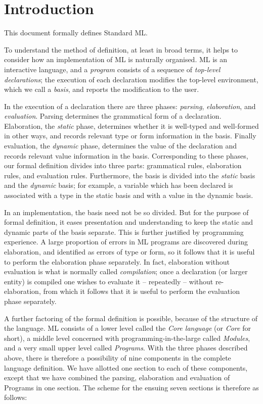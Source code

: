 \section{Introduction}

This document formally defines Standard ML.

To understand the method of definition, at least in broad terms, it helps to
consider how an implementation of ML is naturally
organised.  ML is an interactive
language, 
and a {\sl program}  consists of a sequence of {\sl top-level
declarations}; the execution
of each declaration modifies the top-level environment, which we call
a {\sl basis}, and reports the modification to the user.

In the execution of a declaration there are three phases:
{\sl parsing}, {\sl elaboration}, and {\sl evaluation}.  
Parsing
determines the grammatical form of a declaration.  Elaboration, the
{\sl static} phase, determines whether it is well-typed and
well-formed in other ways, and records relevant type or form information
in the basis. Finally evaluation, the {\sl dynamic} phase, determines the
value of the declaration and records relevant value information in the
basis.  Corresponding to these phases, our formal definition divides
into three parts:  grammatical rules, elaboration rules, and evaluation
rules.  Furthermore, the basis is divided into the {\sl static} 
basis and the {\sl dynamic} basis; for example, a variable which has been
declared is associated with a type in the static basis and with a value in
the dynamic basis.

In an implementation, the basis need not be so divided.  But for the
purpose of formal definition, it eases presentation and understanding to
keep the static and dynamic parts of the basis separate.
This is further justified by programming experience.  A large proportion
of errors in ML programs are discovered during elaboration, and identified
as errors of type or form, so it follows that it is useful to perform
the elaboration phase separately.  In fact, elaboration without
evaluation is  what is normally called {\sl compilation};  
once
a declaration (or larger entity) is compiled one wishes to evaluate it --
repeatedly -- without re-elaboration, from which it follows that it is
useful to perform the evaluation phase separately.

A further factoring of the formal definition is possible,
because of the structure of the language.  ML consists of a lower level
called the {\sl Core language} (or {\sl Core} for short), a middle level
concerned  with programming-in-the-large called {\sl Modules},
and a very small upper level called {\sl Programs}.
With the three phases described above, there is therefore
a possibility of nine components in the
complete language definition. We have allotted one section to each
of these components, except that we have combined the parsing,
elaboration and evaluation of Programs in one section. The
scheme for the ensuing seven sections is therefore as follows:

